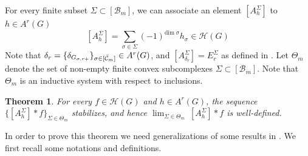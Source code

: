 \documentclass[11 pt]{article}
\numberwithin{equation}{subsection}
\newtheorem{theorem}{Theorem}[section]
\theoremstyle{definition}
\theoremstyle{remark}
\theoremstyle{conjecture}
\newcommand{\HH}{\mathcal H}
\newcommand{\B}{\mathcal{B}}
\newcommand{\mc}{\mathcal}
\newcommand{\mcC}{\mathcal C}
\newcommand{\blue}{\textcolor{blue}}
\begin{document}

For every finite subset $\Sigma \subset [\B_m]$, we can associate an element $[A^\Sigma_h]$ to $h \in A^r(G)$
\begin{equation}\label{averaging defn}
    [A^\Sigma_h] = \sum_{\sigma \in \Sigma }(-1)^{\text{dim} \: \sigma} h_\sigma \in \HH(G)
\end{equation}
Note that $\delta_r= \{\delta_{G_{\sigma,r+}}\}_{\sigma\in [\Bar{\mcC}_m]}\in A^r(G)$, and $[A^\Sigma_{\delta_r}]=E^\Sigma_r$ as defined in \cite{BKV2}.  Let $\Theta_m$ denote the set of non-empty finite convex subcomplexes $\Sigma \subset [\B_m]$. Note that $\Theta_m$ is an inductive system with respect to inclusions. 

\begin{theorem}\label{thm stab frac}
     For every $f\in \mc H(G)$ and $h\in A^r(G)$, the sequence $\{[A^\Sigma_h] * f\}_{\Sigma \in \Theta_m} $ stabilizes, and hence $\lim_{\Sigma \in \Theta_m} \:[A^\Sigma_h] * f $ is well-defined. 
\end{theorem}
In order to prove this theorem we need generalizations of some results in \cite{BKV2}.  We  first recall some notations and definitions.
\end{document}
